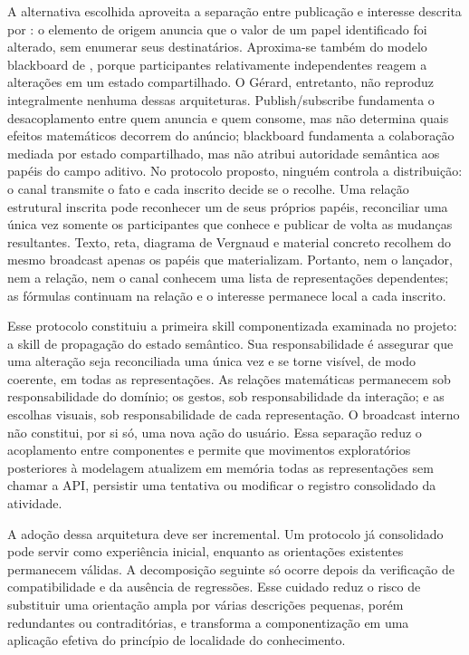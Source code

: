 \documentclass[preprint,12pt,authoryear]{elsarticle}
\newcommand{\gerard}{Gérard\xspace}
\begin{document}
A alternativa escolhida aproveita a separação entre publicação e interesse descrita por \citet{eugster2003many}: o elemento de origem anuncia que o valor de um papel identificado foi alterado, sem enumerar seus destinatários. Aproxima-se também do modelo blackboard de \citet{nii1986blackboard}, porque participantes relativamente independentes reagem a alterações em um estado compartilhado. O \gerard, entretanto, não reproduz integralmente nenhuma dessas arquiteturas. Publish/subscribe fundamenta o desacoplamento entre quem anuncia e quem consome, mas não determina quais efeitos matemáticos decorrem do anúncio; blackboard fundamenta a colaboração mediada por estado compartilhado, mas não atribui autoridade semântica aos papéis do campo aditivo. No protocolo proposto, ninguém controla a distribuição: o canal transmite o fato e cada inscrito decide se o recolhe. Uma relação estrutural inscrita pode reconhecer um de seus próprios papéis, reconciliar uma única vez somente os participantes que conhece e publicar de volta as mudanças resultantes. Texto, reta, diagrama de Vergnaud e material concreto recolhem do mesmo broadcast apenas os papéis que materializam. Portanto, nem o lançador, nem a relação, nem o canal conhecem uma lista de representações dependentes; as fórmulas continuam na relação e o interesse permanece local a cada inscrito.

Esse protocolo constituiu a primeira skill componentizada examinada no projeto: a skill de propagação do estado semântico. Sua responsabilidade é assegurar que uma alteração seja reconciliada uma única vez e se torne visível, de modo coerente, em todas as representações. As relações matemáticas permanecem sob responsabilidade do domínio; os gestos, sob responsabilidade da interação; e as escolhas visuais, sob responsabilidade de cada representação. O broadcast interno não constitui, por si só, uma nova ação do usuário. Essa separação reduz o acoplamento entre componentes e permite que movimentos exploratórios posteriores à modelagem atualizem em memória todas as representações sem chamar a API, persistir uma tentativa ou modificar o registro consolidado da atividade.

A adoção dessa arquitetura deve ser incremental. Um protocolo já consolidado pode servir como experiência inicial, enquanto as orientações existentes permanecem válidas. A decomposição seguinte só ocorre depois da verificação de compatibilidade e da ausência de regressões. Esse cuidado reduz o risco de substituir uma orientação ampla por várias descrições pequenas, porém redundantes ou contraditórias, e transforma a componentização em uma aplicação efetiva do princípio de localidade do conhecimento.
\end{document}
